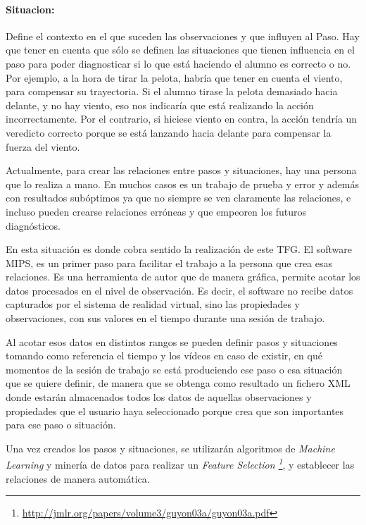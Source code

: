 \paragraph{\textbf{Situacion:}}
Define el contexto en el que suceden las observaciones y que influyen al Paso. Hay que
tener en cuenta que s\'olo se definen las situaciones que tienen influencia en el paso
para poder diagnosticar si lo que est\'a haciendo el alumno es correcto o no. Por ejemplo, a la hora
de tirar la pelota, habr\'ia que tener en cuenta el viento, para compensar su trayectoria. Si el alumno
tirase la pelota demasiado hacia delante, y no hay viento, eso nos indicar\'ia que est\'a realizando la acci\'on
incorrectamente. Por el contrario, si hiciese viento en contra, la acci\'on tendr\'ia un veredicto correcto
porque se est\'a lanzando hacia delante para compensar la fuerza del viento.

Actualmente, para crear las relaciones entre pasos y situaciones, hay una persona que lo realiza a mano. En muchos casos
es un trabajo de prueba y error y adem\'as con resultados sub\'optimos ya que no siempre se ven claramente las relaciones,
e incluso pueden crearse relaciones err\'oneas y que empeoren los futuros diagn\'osticos.

En esta situaci\'on es donde cobra sentido la realizaci\'on de este TFG. El software MIPS, es un primer paso para facilitar
el trabajo a la persona que crea esas relaciones. Es una herramienta de autor que de manera gr\'afica, permite
acotar los datos procesados en el nivel de observaci\'on. Es decir, el software no recibe datos capturados por
el sistema de realidad virtual, sino
las propiedades y observaciones, con sus valores en el tiempo durante una sesi\'on de trabajo.

Al acotar esos datos en distintos rangos se pueden definir pasos y situaciones tomando como referencia
el tiempo y los v\'ideos en caso de existir, en qu\'e momentos de la sesi\'on de trabajo
se est\'a produciendo ese paso o esa situaci\'on que se quiere definir, de manera que se obtenga
como resultado un fichero XML donde estar\'an almacenados todos los datos de aquellas observaciones y 
propiedades que el usuario haya seleccionado porque crea que son importantes para ese paso o 
situaci\'on.

Una vez creados los pasos y situaciones, se utilizar\'an algoritmos de \emph{Machine Learning} 
y miner\'ia de datos para
realizar un \emph{Feature Selection 
\footnote{\url{http://jmlr.org/papers/volume3/guyon03a/guyon03a.pdf}}},
y establecer las relaciones de manera autom\'atica.

